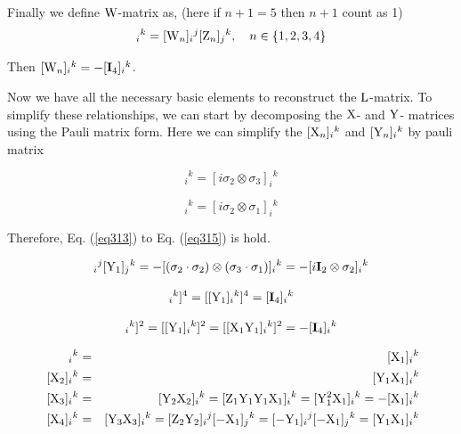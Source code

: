 \documentclass[12pt]{article}
\def\rL{{\rm L}}
\let\bm\relax
\newcommand{\bm}[1]{{\boldsymbol{#1}}}
\begin{document}
Finally we define $\bm{\rm W}$-matrix as, (here if $n+1=5$ then $n+1$ count as 1)
\begin{equation}
[{\bm{\rm Z}}_{n+1}]_{i}{}^{k}=[{\bm{\rm W}}_n]_{i}{}^{j}[{\bm{\rm Z}}_n]_{j}{}^{k},\quad n\in\{1,2,3,4\}
\label{eq4-11}
\end{equation}


Then $[{\bm{\rm W}}_n]_{i}{}^{k}=-[\mathbf{I}_{4}]_{i}{}^{k}$.

Now we have all the necessary basic elements to reconstruct the ${\bm{\rL}}$-matrix. To simplify these relationships, we can start by decomposing the ${\bm{\rm X}}$- and ${\bm{\rm Y}}$- matrices using the Pauli matrix form.
Here we can simplify the $[{\bm{\rm X}}_{n}]_{i}{}^{k}$ and $[{\bm{\rm Y}}_{n}]_{i}{}^{k}$ by pauli matrix

\begin{equation}
[{\bm{\rm X}}_1]_{i}{}^{k}=[i\sigma_2\otimes \sigma_3]_{i}{}^{k}
\end{equation}

\begin{equation}
[{\bm{\rm Y}}_1]_{i}{}^{k}=[i\sigma_2\otimes \sigma_1]_{i}{}^{k}
\end{equation}

Therefore, Eq. (\ref{eq313}) to Eq. (\ref{eq315}) is hold.

\begin{equation}
[{\bm{\rm X}}_1]_{i}{}^{j}[{\bm{\rm Y}}_1]_{j}{}^{k}=-[(\sigma_2\cdot\sigma_2)\otimes(\sigma_3\cdot\sigma_1)]_{i}{}^{k}=-[i\mathbf{I}_2\otimes\sigma_2]_{i}{}^{k}
\label{eq313}
\end{equation}

\begin{equation}
[[{\bm{\rm X}}_1]_{i}{}^{k}]^4=[[{\bm{\rm Y}}_1]_{i}{}^{k}]^4=[\mathbf{I}_4]_{i}{}^{k}
\end{equation}

\begin{equation}
[[{\bm{\rm X}}_1]_{i}{}^{k}]^2=[[{\bm{\rm Y}}_1]_{i}{}^{k}]^2=[[\bm{\rm X_1Y_1}]_{i}{}^{k}]^2=-[\mathbf{I}_4]_{i}{}^{k}
\label{eq315}
\end{equation}

\begin{eqnarray}
[{\bm{\rm X}}_1]_{i}{}^{k}&=&[{\bm{\rm X}}_1]_{i}{}^{k}\label{eq316}\\
\
[{\bm{\rm X}}_2]_{i}{}^{k}&=&[\bm{\rm Y_1X_1}]_{i}{}^{k}\\
\
[{\bm{\rm X}}_3]_{i}{}^{k}&=&[\bm{\rm Y_2X_2}]_{i}{}^{k}
=[\bm{\rm Z_1 Y_1 Y_1 X_1}]_{i}{}^{k}
=[\bm{\rm Y_1^2X_1}]_{i}{}^{k}=-[{\bm{\rm X}}_1]_{i}{}^{k}\\
\
[{\bm{\rm X}}_4]_{i}{}^{k}&=&[\bm{\rm Y_3X_3}]_{i}{}^{k}
=[\bm{\rm Z_2 Y_2}]_{i}{}^{j}[-\bm{\rm X_1}]_{j}{}^{k}
=[-\bm{\rm Y}_1]_{i}{}^{j}[-\bm{\rm X_1}]_{j}{}^{k}
=[\bm{\rm Y_1X_1}]_{i}{}^{k}
\label{eq319}
\end{eqnarray}
\end{document}
